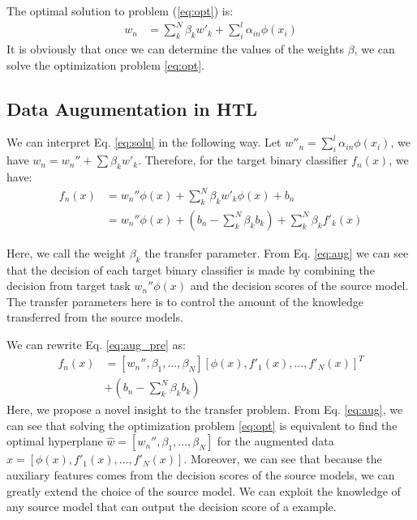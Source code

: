 The optimal solution to problem (\ref{eq:opt}) is:
\begin{equation}\label{eq:solu}
\begin{aligned}
{w_{n}}&= \sum\limits_k^N {{\beta _k}{{w'}_k}}  + \sum\limits_i^l {{\alpha _{in}}{\phi(x_i)}} 
\end{aligned}
\end{equation}
It is obviously that once we can determine the values of the weights $\beta$, we can solve the optimization problem \eqref{eq:opt}.

\subsection{Data Augumentation in HTL}
We can interpret Eq. \eqref{eq:solu} in the following way. Let $w''_n=\sum\limits_i^l {{\alpha _{in}}{\phi(x_i)}}$, we have $w_{n} = w_{n}''+\sum\limits{\beta _kw'_k}$. Therefore, for the target binary classifier $f_n(x)$, we have:
\begin{equation}\label{eq:aug_pre}
\begin{aligned}
f_n(x)&=w_{n}''\phi(x)+\sum\limits_k^N{\beta _kw'_k\phi(x)}+b_n\\
&=w_{n}''\phi(x)+(b_n-\sum\limits_k^N{\beta _kb_k})+\sum\limits_k^N{\beta _kf'_k(x)}
\end{aligned}
\end{equation}

Here, we call the weight $\beta_k$ the transfer parameter. From Eq. \eqref{eq:aug} we can see that the decision of each target binary classifier is made by combining the decision from target task $w_{n}''\phi(x)$ and the decision scores of the source model. The transfer parameters here is to control the amount of the knowledge transferred from the source models.

We can rewrite Eq. \eqref{eq:aug_pre} as:
\begin{equation}\label{eq:aug}
\begin{aligned}
f_n(x)&= [w_{n}'',\beta_1,...,\beta_N][\phi(x),f'_1(x),...,f'_N(x)]^T\\&+(b_n-\sum\limits_k^N{\beta _kb_k})
\end{aligned}
\end{equation}
Here, we propose a novel insight to the transfer problem. From Eq. \eqref{eq:aug}, we can see that solving the optimization problem \eqref{eq:opt} is equivalent to find the optimal hyperplane $\hat{w}=[w_{n}'',\beta_1,...,\beta_N]$ for the augmented data $\hat{x}=[\phi(x),f'_1(x),...,f'_N(x)]$. Moreover, we can see that because the auxiliary features comes from the decision scores of the source models, we can greatly extend the choice of the source model. We can exploit the knowledge of any source model that can output the decision score of a example.

